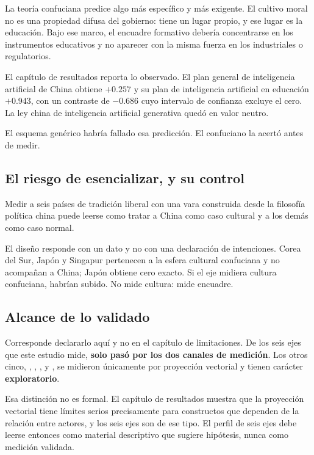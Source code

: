 La teoría confuciana predice algo más específico y más exigente. El cultivo moral no es una propiedad difusa del gobierno: tiene un lugar propio, y ese lugar es la educación. Bajo ese marco, el encuadre formativo debería concentrarse en los instrumentos educativos y no aparecer con la misma fuerza en los industriales o regulatorios.

El capítulo de resultados reporta lo observado. El plan general de inteligencia artificial de China obtiene $+0.257$ y su plan de inteligencia artificial en educación $+0.943$, con un contraste de $-0.686$ cuyo intervalo de confianza excluye el cero. La ley china de inteligencia artificial generativa quedó en valor neutro.

El esquema genérico habría fallado esa predicción. El confuciano la acertó antes de medir.

\subsection*{El riesgo de esencializar, y su control}

Medir a seis países de tradición liberal con una vara construida desde la filosofía política china puede leerse como tratar a China como caso cultural y a los demás como caso normal.

El diseño responde con un dato y no con una declaración de intenciones. Corea del Sur, Japón y Singapur pertenecen a la esfera cultural confuciana y no acompañan a China; Japón obtiene cero exacto. Si el eje midiera cultura confuciana, habrían subido. No mide cultura: mide encuadre.

\subsection*{Alcance de lo validado}

Corresponde declararlo aquí y no en el capítulo de limitaciones. De los seis ejes que este estudio mide, \textbf{solo \ejedf{} pasó por los dos canales de medición}. Los otros cinco, \ren, \lipin, \yi, \xiushen{} y \hepin, se midieron únicamente por proyección vectorial y tienen carácter \textbf{exploratorio}.

Esa distinción no es formal. El capítulo de resultados muestra que la proyección vectorial tiene límites serios precisamente para constructos que dependen de la relación entre actores, y los seis ejes son de ese tipo. El perfil de seis ejes debe leerse entonces como material descriptivo que sugiere hipótesis, nunca como medición validada.


